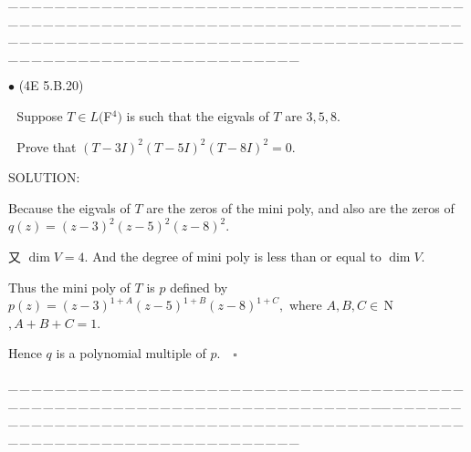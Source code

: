 \documentclass[a4paper, 11pt, UTF8]{article}
\def\Nbfc{$\,{\timesbf N}$}
\begin{document}
\begin{large}
\par
{\tiny \_\,\_\,\_\,\_\,\_\,\_\,\_\,\_\,\_\,\_\,\_\,\_\,\_\,\_\,\_\,\_\,\_\,\_\,\_\,\_\,\_\,\_\,\_\,\_\,\_\,\_\,\_\,\_\,\_\,\_\,\_\,\_\,\_\,\_\,\_\,\_\,\_\,\_\,\_\,\_\,\_\,\_\,\_\,\_\,\_\,\_\,\_\,\_\,\_\,\_\,\_\,\_\,\_\,\_\,\_\,\_\,\_\,\_\,\_\,\_\,\_\,\_\,\_\,\_\,\_\,\_\,\_\,\_\,\_\,\_\,\_\_\,\_\,\_\,\_\,\_\,\_\,\_\,\_\,\_\,\_\,\_\,\_\,\_\,\_\,\_\,\_\,\_\,\_\,\_\,\_\,\_\,\_\,\_\,\_\,\_\,\_\,\_\,\_\,\_\,\_\,\_\,\_\,\_\,\_\,\_\,\_\,\_\,\_\,\_\,\_\,\_\,\_\,\_\,\_\,\_\,\_\,\_\,\_\,\_\,\_\,\_\,\_\,\_\,\_\,\_\,\_\,\_\,\_\,\_\,\_\,\_\,\_\,\_\,\_\,\_\,\_\,\_\,\_\,\_\,\_\,\_}\par

{\small $\bullet$} (\normalsize{4E 5.B.20})\par\,\, {\timessl\Large 
Suppose $T\in L(${\timesbf F}$^4)$ is such that the eigvals of $T$ are $3, 5, 8$.}\par\,\,
{\timessl\Large Prove that
$(T - 3I)^2 (T - 5I)^2 (T - 8I)^2 = 0$.
}\par
{\timesbf S\footnotesize{OLUTION:}}\par\quad
Because the eigvals of $T$ are the zeros of the mini poly, and also are the zeros of $q(z)=(z-3)^2(z-5)^2(z-8)^2$.\par\quad
又 $\dim V=4.$ And the degree of mini poly is less than or equal to $\dim V.$\par\quad
Thus the mini poly of $T$ is $p$ defined by $p(z)=(z-3)^{1+A} (z-5)^{1+B} (z-8)^{1+C},$ where $A,B,C\in\Nbfc,A+B+C=1.$\par\quad
Hence $q$ is a polynomial multiple of $p.\quad\square$\par
{\tiny \_\,\_\,\_\,\_\,\_\,\_\,\_\,\_\,\_\,\_\,\_\,\_\,\_\,\_\,\_\,\_\,\_\,\_\,\_\,\_\,\_\,\_\,\_\,\_\,\_\,\_\,\_\,\_\,\_\,\_\,\_\,\_\,\_\,\_\,\_\,\_\,\_\,\_\,\_\,\_\,\_\,\_\,\_\,\_\,\_\,\_\,\_\,\_\,\_\,\_\,\_\,\_\,\_\,\_\,\_\,\_\,\_\,\_\,\_\,\_\,\_\,\_\,\_\,\_\,\_\,\_\,\_\,\_\,\_\,\_\,\_\_\,\_\,\_\,\_\,\_\,\_\,\_\,\_\,\_\,\_\,\_\,\_\,\_\,\_\,\_\,\_\,\_\,\_\,\_\,\_\,\_\,\_\,\_\,\_\,\_\,\_\,\_\,\_\,\_\,\_\,\_\,\_\,\_\,\_\,\_\,\_\,\_\,\_\,\_\,\_\,\_\,\_\,\_\,\_\,\_\,\_\,\_\,\_\,\_\,\_\,\_\,\_\,\_\,\_\,\_\,\_\,\_\,\_\,\_\,\_\,\_\,\_\,\_\,\_\,\_\,\_\,\_\,\_\,\_\,\_\,\_}\par


\end{large}
\end{document}
